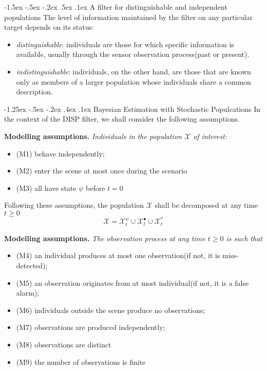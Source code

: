 \documentclass[a4paper, 11pt]{article}
\makeatletter
\newcommand{\sihao}{\fontsize{14pt}{\baselineskip}\selectfont}
\newcommand{\xiaosihao}{\fontsize{12pt}{\baselineskip}\selectfont}
\renewcommand\section{\@startsection{section}{1}{\z@}%
{-1.5ex \@plus -.5ex \@minus -.2ex}%
{.5ex \@plus .1ex}%
{\normalfont\sihao\CJKfamily{hei}}}
\renewcommand\subsection{\@startsection{subsection}{1}{\z@}%
{-1.25ex \@plus -.5ex \@minus -.2ex}%
{.4ex \@plus .1ex}%
{\normalfont\xiaosihao\CJKfamily{hei}}}
\makeatother
\begin{document}
\begin{CJK}{UTF8}{gbsn}
\newpage
\tableofcontents


\section{A filter for distinguishable and independent
populations}
The level of information maintained by the filter on any particular target depends on its status:
\begin{itemize}
\item \emph{distinguishable}: individuals are those for which specific information is available, usually through the sensor observation process(past or present).
\item \emph{indistinguishable}: individuals, on the other hand, are those that are known only as members of a larger population whose individuals share a common description.
\end{itemize}
\subsection{Bayesian Estimation with Stochastic Populcations}
In the context of the DISP filter, we shall consider the following assumptions.

\textbf{Modelling assumptions.} \emph{Individuals in the population $\mathcal{X}$ of interest:}
\begin{itemize}
  \item (M1) behave independently;
  \item (M2) enter the scene at most once during the scenario
  \item (M3) all have state $\psi$ before $t=0$
\end{itemize}
Following these assumptions, the population $\mathcal{X}$ shall be decomposed at any time $t \geq 0$
\[
\mathcal{X} = \mathcal{X}_t^{\psi} \cup \mathcal{X}_t^{\bullet} \cup \mathcal{X}_t^{*}
\]

\textbf{Modelling assumptions.} \emph{The observation process at any time $t \geq 0$ is such that}
\begin{itemize}
  \item  (M4) an individual produces at most one observation(if not, it is miss-detected);
  \item  (M5) an observation originates from at most individual(if not, it is a false alarm);
  \item  (M6) individuals outside the scene produce no observations;
  \item  (M7) observations are produced independently;
  \item  (M8) observations are distinct
  \item  (M9) the number of observations is finite
\end{itemize}



\end{CJK}
\end{document}

